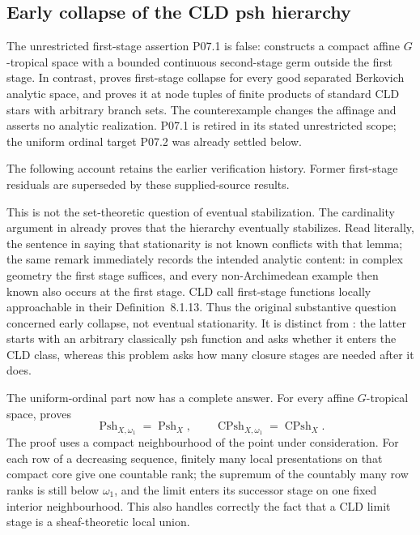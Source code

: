 \subsection{Early collapse of the CLD psh hierarchy}
\label{sec:ch72-hierarchy-history}

\begin{remark}\label{prob:frontier-cld-hierarchy}
The unrestricted first-stage assertion P07.1 is false:
 constructs a compact affine
\(G\)-tropical space with a bounded continuous second-stage germ outside the
first stage. In contrast, 
proves first-stage collapse for every good separated Berkovich analytic
space, and  proves it at
node tuples of finite products of standard CLD stars with arbitrary branch
sets. The counterexample changes the affinage and asserts no analytic
realization. P07.1 is retired in its stated unrestricted scope; the uniform
ordinal target P07.2 was already settled below.
\end{remark}

The following account retains the earlier verification history. Former
first-stage residuals are superseded by these supplied-source results.


This is not the set-theoretic question of eventual stabilization.  The
cardinality argument in \cite[Lemma~8.1.4]{CLD25} already proves that the
hierarchy eventually stabilizes.  Read literally, the sentence in
\cite[Remark~8.1.6]{CLD25} saying that stationarity is not known conflicts
with that lemma; the same remark immediately records the intended analytic
content: in complex geometry the first stage suffices, and every
non-Archimedean example then known also occurs at the first stage.  CLD call
first-stage functions locally approachable in their Definition~8.1.13.
Thus the original substantive question concerned early collapse, not
eventual stationarity.  It is distinct from
: the latter starts with an
arbitrary classically psh function and asks whether it enters the CLD class,
whereas this problem asks how many closure stages are needed after it does.

The uniform-ordinal part now has a complete answer.  For every affine
\(G\)-tropical space,
 proves
\[
 \operatorname{Psh}_{X,\omega_1}=\operatorname{Psh}_X,
 \qquad
 \operatorname{CPsh}_{X,\omega_1}=\operatorname{CPsh}_X.
\]
The proof uses a compact neighbourhood of the point under consideration.
For each row of a decreasing sequence, finitely many local presentations on
that compact core give one countable rank; the supremum of the countably many
row ranks is still below \(\omega_1\), and the limit enters its successor
stage on one fixed interior neighbourhood.  This also handles correctly the
fact that a CLD limit stage is a sheaf-theoretic local union.

